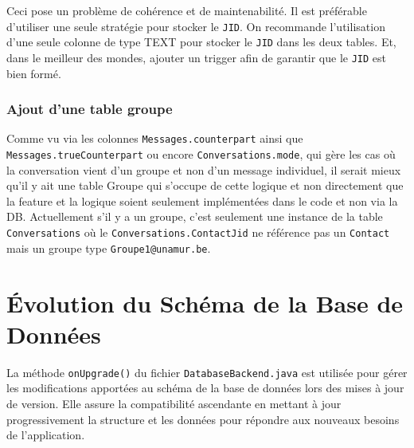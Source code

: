 \documentclass[a4paper,11pt]{article}
\begin{document}
Ceci pose un problème de cohérence et de maintenabilité. Il est préférable d'utiliser une seule stratégie pour stocker le \texttt{JID}. On recommande l'utilisation d'une seule colonne de type TEXT pour stocker le \texttt{JID} dans les deux tables. Et, dans le meilleur des mondes, ajouter un trigger afin de garantir que le \texttt{JID} est bien formé.

\subsubsection*{Ajout d'une table groupe}

Comme vu via les colonnes \texttt{Messages.counterpart} ainsi que \texttt{Messages.trueCounterpart} ou encore \texttt{Conversations.mode}, qui gère les cas où la conversation vient d'un groupe et non d'un message individuel, il serait mieux qu'il y ait une table Groupe qui s'occupe de cette logique et non directement que la feature et la logique soient seulement implémentées dans le code et non via la DB. Actuellement s'il y a un groupe, c'est seulement une instance de la table \texttt{Conversations}
où le \texttt{Conversations.ContactJid} ne référence pas un \texttt{Contact} mais un groupe type \texttt{Groupe1@unamur.be}.






\section*{Évolution du Schéma de la Base de Données}


La méthode \texttt{onUpgrade()} du fichier \texttt{DatabaseBackend.java} est utilisée pour gérer les modifications apportées au schéma de la base de données lors des mises à jour de version. Elle assure la compatibilité ascendante en mettant à jour progressivement la structure et les données pour répondre aux nouveaux besoins de l'application. \newline
\end{document}
